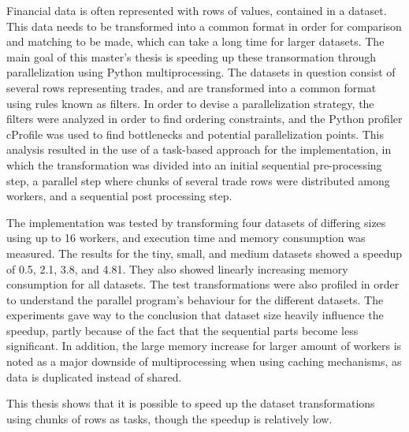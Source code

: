 Financial data is often represented with rows of values, contained in a dataset. This data needs to be transformed into a common format in order for
comparison and matching to be made, which can take a long time for larger datasets.
The main goal of this master’s thesis is speeding up these transormation through parallelization using Python multiprocessing.
The datasets in question consist of several rows representing trades, and are transformed into a common format using rules known as filters. In order to devise a
parallelization strategy, the filters were analyzed in order to find ordering constraints, and the Python profiler cProfile was used to find bottlenecks
and potential parallelization points. This analysis resulted in the use of a task-based approach for the implementation, in which the transformation
was divided into an initial sequential pre-processing step, a parallel step where chunks of several trade rows were distributed among workers, and a
sequential post processing step. 

The implementation was tested by transforming four datasets of differing sizes using up to 16 workers, and execution time and memory consumption
was measured. The results for the tiny, small, and medium datasets showed a speedup of 0.5, 2.1, 3.8, and 4.81. They also showed linearly increasing
memory consumption for all datasets.  The test transformations were also profiled in order to understand the parallel program’s behaviour for the
different datasets. The experiments gave way to the conclusion that dataset size heavily influence the speedup, partly because of the fact that
the sequential parts become less significant.  In addition, the large memory increase for larger amount of workers is noted as a major downside of
multiprocessing when using caching mechanisms, as data is duplicated instead of shared.

This thesis shows that it is possible to speed up the dataset transformations using chunks of rows as tasks, though the speedup is relatively low.
